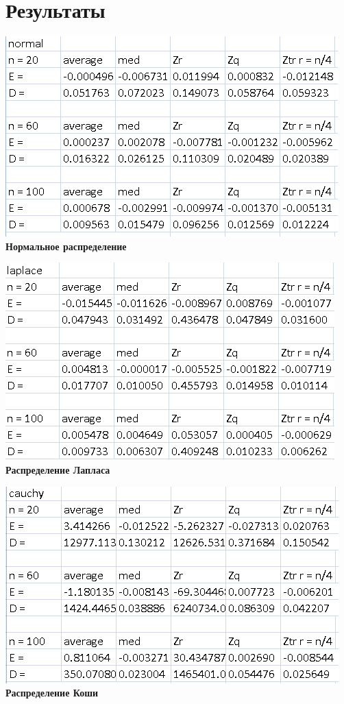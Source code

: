 \documentclass[a4]{article}
\begin{document}
\newpage
\section{Результаты}

\begin{center}

\includegraphics[width=\textwidth]{normal.png} \textbf{Нормальное распределение}
\vspace{50pt}

\includegraphics[width=\textwidth]{laplace.png} \textbf{Распределение Лапласа}\\
\vspace{50pt}

\includegraphics[width=\textwidth]{cauchy.png} \textbf{Распределение Коши }\\
\vspace{50pt}


\end{center}
\end{document}
